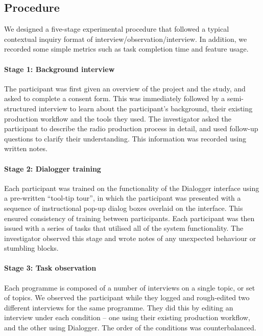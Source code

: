\subsection{Procedure}
We designed a five-stage experimental procedure that followed a typical contextual inquiry format of
interview/observation/interview. In addition, we recorded some simple metrics such as task completion time and feature
usage.

\paragraph{Stage 1: Background interview}
    The participant was first given an overview of the project and the study, and asked to complete a consent form. This
    was immediately followed by a semi-structured interview to learn about the participant's background, their existing
    production workflow and the tools they used. The investigator asked the participant to describe the
    radio production process in detail, and used follow-up questions to clarify their understanding. This information
    was recorded using written notes.

\paragraph{Stage 2: Dialogger training}
    Each participant was trained on the functionality of the Dialogger interface using a pre-written ``tool-tip tour'',
    in which the participant was presented with a sequence of instructional pop-up dialog boxes overlaid on the
    interface.  This ensured consistency of training between participants. Each participant was then issued with a
    series of tasks that utilised all of the system functionality. The investigator observed this stage and wrote notes
    of any unexpected behaviour or stumbling blocks.

\paragraph{Stage 3: Task observation}
    Each programme is composed of a number of interviews
    on a single topic, or set of topics.  We observed the participant while they logged and rough-edited two
    different interviews for the same programme. They did this by editing an interview under each condition -- one
    using their existing production workflow, and the other using Dialogger. The order of the conditions was
    counterbalanced.

